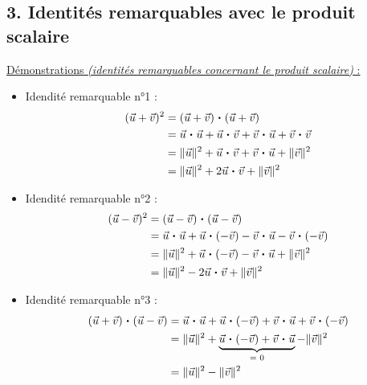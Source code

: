 \documentclass[11pt,a4paper]{article}
\newcommand{\pdt}{\mathbin{\vcenter{\hbox{\scalebox{0.6}{\textbullet}}}}}
\begin{document}
\subsection*{3. Identités remarquables avec le produit scalaire}

\underline{Démonstrations \emph{(identités remarquables concernant le produit scalaire)} :}

\begin{itemize}
    \item Idendité remarquable n°1 :
    \begin{equation*}
        \begin{split}
            (\vec{u}+\vec{v})^2&=(\vec{u}+\vec{v})\pdt(\vec{u}+\vec{v}) \\
            &=\vec{u}\pdt\vec{u}+\vec{u}\pdt\vec{v}+\vec{v}\pdt\vec{u}+\vec{v}\pdt\vec{v} \\
            &=\|\vec{u}\|^2+\vec{u}\pdt\vec{v}+\vec{v}\pdt\vec{u}+\|\vec{v}\|^2\\
            &=\|\vec{u}\|^2+2\vec{u}\pdt\vec{v}+\|\vec{v}\|^2
        \end{split}
    \end{equation*}
    \item Idendité remarquable n°2 :
    \begin{equation*}
        \begin{split}
            (\vec{u}-\vec{v})^2&=(\vec{u}-\vec{v})\pdt(\vec{u}-\vec{v}) \\
            &=\vec{u}\pdt\vec{u}+\vec{u}\pdt(-\vec{v})-\vec{v}\pdt\vec{u}-\vec{v}\pdt(-\vec{v}) \\
            &=\|\vec{u}\|^2+\vec{u}\pdt(-\vec{v})-\vec{v}\pdt\vec{u}+\|\vec{v}\|^2\\
            &=\|\vec{u}\|^2-2\vec{u}\pdt\vec{v}+\|\vec{v}\|^2
        \end{split}
    \end{equation*}
    \item Idendité remarquable n°3 :
    \begin{equation*}
        \begin{split}
            (\vec{u}+\vec{v})\pdt(\vec{u}-\vec{v})&=\vec{u}\pdt\vec{u}+\vec{u}\pdt(-\vec{v})+\vec{v}\pdt\vec{u}+\vec{v}\pdt(-\vec{v}) \\
            &=\|\vec{u}\|^2+\underbrace{\vec{u}\pdt(-\vec{v})+\vec{v}\pdt\vec{u}}_{= \text{ }0}-\|\vec{v}\|^2 \\
            &=\|\vec{u}\|^2-\|\vec{v}\|^2
        \end{split}
    \end{equation*}
\end{itemize}
\end{document}

